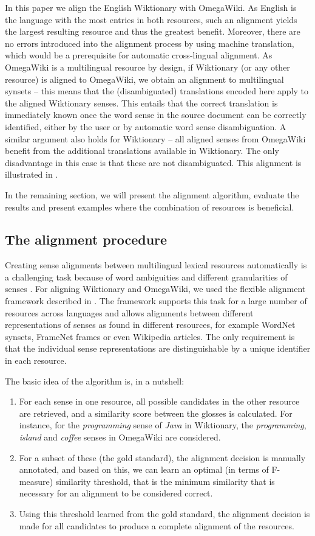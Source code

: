 \documentclass[output=paper]{LSP/langsci}
\begin{document}
In this paper we align the English Wiktionary with OmegaWiki. As English is the language with the most entries in both resources, such an alignment yields the largest resulting resource and thus the greatest benefit. Moreover, there are no errors introduced into the alignment process by using machine translation, which would be a prerequisite for automatic cross-lingual alignment. 
As Omega\-Wiki is a multilingual resource by design, if Wiktionary (or any other resource) is aligned to OmegaWiki, we obtain an alignment to multilingual synsets -- this means that the (disambiguated) translations encoded here apply to the aligned Wiktionary senses. This entails that the correct translation is immediately known once the word sense in the source document can be correctly identified, either by the user or by automatic word sense disambiguation. A similar argument also holds for Wiktionary -- all aligned senses from OmegaWiki benefit from the additional translations available in Wiktionary. The only disadvantage in this case is that these are not disambiguated. This alignment is illustrated in .

In the remaining section, we will present the alignment algorithm, evaluate the results and present examples where the combination of resources is beneficial.

\subsection{The alignment procedure}
Creating sense alignments between multilingual lexical resources automatically is a challenging task because of word ambiguities and different granularities of senses \citep{Navigli06}. For aligning Wiktionary and OmegaWiki, we used the flexible alignment framework described in \citet{Niemann2011}. The framework supports this task for a large number of resources across languages and allows alignments between different representations of senses as found in different resources, for example WordNet synsets, FrameNet frames or even Wikipedia articles. The only requirement is that the individual sense representations are distinguishable by a unique identifier in each resource. 

The basic idea of the algorithm is, in a nutshell:
\begin{enumerate}
 \item For each sense in one resource, all possible candidates in the other resource are retrieved, and a similarity score between the glosses is calculated. For instance, for the \emph{programming} sense of \textit{Java} in Wiktionary, the \emph{programming}, \emph{island} and \emph{coffee} senses in OmegaWiki are considered.
\item For a subset of these (the gold standard), the alignment decision is manually annotated, and based on this, we can learn an optimal (in terms of F-measure) similarity threshold, that is the minimum similarity that is necessary for an alignment to be considered correct. 
\item Using this threshold learned from the gold standard, the alignment decision is made for all candidates to produce a complete alignment of the resources.
\end{enumerate}
\end{document}
